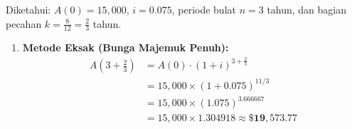 \documentclass[11pt,a4paper]{article}
\begin{document}
\begin{solutionbox}[Soal 5]
Diketahui: $A(0) = 15{,}000$, $i = 0.075$, periode bulat $n = 3$ tahun, dan bagian pecahan $k = \frac{8}{12} = \frac{2}{3}$ tahun.
\begin{enumerate}[label=(\alph*)]
    \item \textbf{Metode Eksak (Bunga Majemuk Penuh):}
    \begin{align*}
        A\left(3 + \tfrac{2}{3}\right) &= A(0) \cdot (1 + i)^{3 + \frac{2}{3}} \\
        &= 15{,}000 \times (1 + 0.075)^{11/3} \\
        &= 15{,}000 \times (1.075)^{3.666667} \\
        &= 15{,}000 \times 1.304918 \approx \mathbf{\$19{,}573.77}
    \end{align*}


\end{enumerate}
\end{solutionbox}
\end{document}

